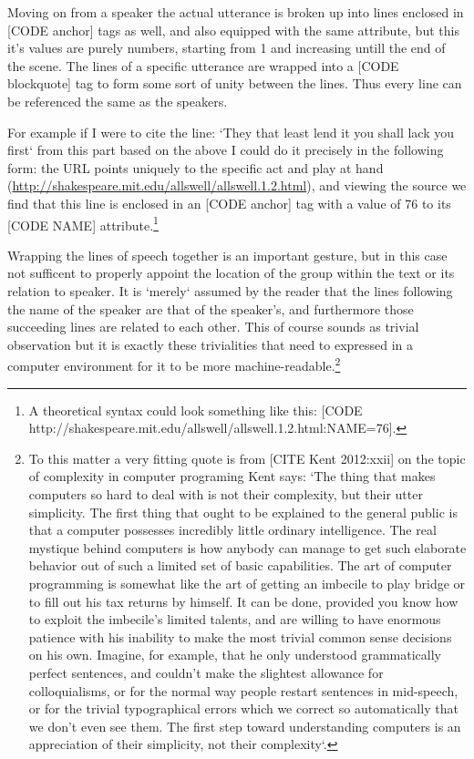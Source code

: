 Moving on from a speaker the actual utterance is broken up into lines enclosed in [CODE anchor] tags as well, and also equipped with the same attribute, but this it's values are purely numbers, starting from 1 and increasing untill the end of the scene. The lines of a specific utterance are wrapped into a [CODE blockquote] tag to form some sort of unity between the lines. Thus every line can be referenced the same as the speakers.

For example if I were to cite the line: `They that least lend it you shall lack you first` from this part based on the above I could do it precisely in the following form: the URL points uniquely to the specific act and play at hand (\url{http://shakespeare.mit.edu/allswell/allswell.1.2.html}), and viewing the source we find that this line is enclosed in an [CODE anchor] tag with a value of 76 to its [CODE NAME] attribute.\footnote{A theoretical syntax could look something like this: [CODE http://shakespeare.mit.edu/allswell/allswell.1.2.html:NAME=76].} 

Wrapping the lines of speech together is an important gesture, but in this case not sufficent to properly appoint the location of the group within the text or its relation to speaker. It is `merely` assumed by the reader that the lines following the name of the speaker are that of the speaker's, and furthermore those succeeding lines are related to each other. This of course sounds as trivial observation but it is exactly these trivialities that need to expressed in a computer environment for it to be more machine-readable.\footnote{To this matter a very fitting quote is from [CITE Kent 2012:xxii] on the topic of complexity in computer programing Kent says: `The thing that makes computers so hard to deal with is not their complexity, but their utter simplicity. The first thing that ought to be explained to the general public is that a computer possesses incredibly little ordinary intelligence. The real mystique behind computers is how anybody can manage to get such elaborate behavior out of such a limited set of basic capabilities. The art of computer programming is somewhat like the art of getting an imbecile to play bridge or to fill out his tax returns by himself. It can be done, provided you know how to exploit the imbecile’s limited talents, and are willing to have enormous patience with his inability to make the most trivial common sense decisions on his own. Imagine, for example, that he only understood grammatically perfect sentences, and couldn’t make the slightest allowance for colloquialisms, or for the normal way people restart sentences in mid-speech, or for the trivial typographical errors which we correct so automatically that we don’t even see them. The first step toward understanding computers is an appreciation of their simplicity, not their complexity`.}


